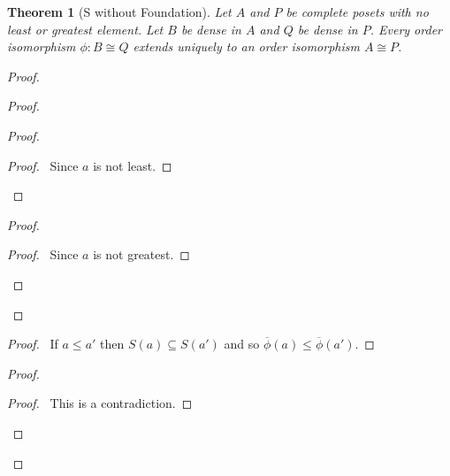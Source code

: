 \documentclass{book}
\newtheorem{thm}[ax]{Theorem}
\theoremstyle{definition}
\begin{document}
\begin{thm}[S without Foundation]
\label{thm:extendorderiso}
Let $A$ and $P$ be complete posets with no least or greatest element. Let $B$ be dense in $A$ and $Q$ be dense in $P$. Every order isomorphism $\phi : B \cong Q$ extends uniquely to an order isomorphism $A \cong P$.
\end{thm}

\begin{proof}
\pf
{}
\begin{proof}
	\begin{proof}
		\begin{proof}
			\pf\ Since $a$ is not least.
		\end{proof}
	\end{proof}
	\begin{proof}
		\begin{proof}
			\pf\ Since $a$ is not greatest.
		\end{proof}
	\end{proof}
\end{proof}
\begin{proof}
	\pf\ If $a \leq a'$ then $S(a) \subseteq S(a')$ and so $\overline{\phi}(a) \leq \overline{\phi}(a')$.
\end{proof}
\begin{proof}
	\qedstep
	\begin{proof}
		\pf\ This is a contradiction.
	\end{proof}
\end{proof}

\end{proof}
\end{document}
